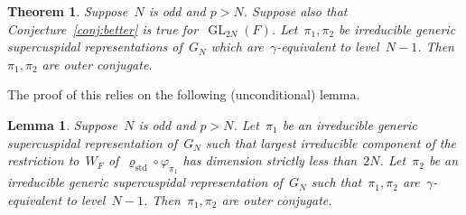 \documentclass[12pt]{amsart}
\newcommand{\GL}{\operatorname{GL}}
\def\rhostd{\varrho_{\mathrm{std}}} %
\newtheorem{thm}{Theorem}[section]
\newtheorem{lem}[thm]{Lemma}
\newtheorem{thm}[equation]{Theorem}
\newtheorem{lem}[equation]{Lemma}
\begin{document}
\begin{thm}\label{thm:Gbetter}
Suppose~$N$ is odd and $p>N$. Suppose also that Conjecture~\ref{conj:better} is true for~$\GL_{2N}(F)$. Let~$\pi_1,\pi_2$ be irreducible generic supercuspidal representations of~$G_N$ which are~$\gamma$-equivalent to level~$N-1$.
Then~$\pi_1, \pi_2$ are outer conjugate.  
\end{thm}

The proof of this relies on the following (unconditional) lemma.

\begin{lem}\label{lem:nonmaxbetter}
Suppose~$N$ is odd and $p>N$. Let~$\pi_1$ be an irreducible generic supercuspidal representation of~$G_N$ such that largest irreducible component of the restriction to~$W_F$ of~$\rhostd\circ\varphi_{\pi_1}$ has dimension strictly less than~$2N$. Let~$\pi_2$ be an irreducible generic supercuspidal representation of~$G_N$ such that~$\pi_1,\pi_2$ are~$\gamma$-equivalent to level~$N-1$.
Then~$\pi_1, \pi_2$ are outer conjugate.  
\end{lem}
\end{document}
